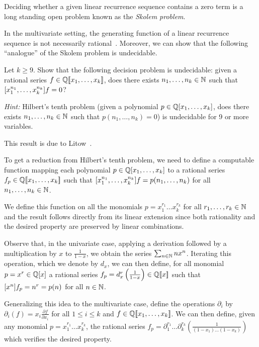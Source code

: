 Deciding whether a given linear recurrence sequence contains a zero
term is a long standing open problem known as the \emph{Skolem problem}.

In the multivariate setting, the generating function of a linear
recurrence sequence is not necessarily rational~\cite{BouPet2000}.
Moreover, we can show that the following \enquote{analogue} of the Skolem
problem is undecidable.
\begin{exercise}
    Let $k \geq 9$.
    Show that the following decision problem is undecidable:
    given a rational series $f \in \mathbb Q[\![x_1,\dots,x_k]\!]$,
    does there exists $n_1,\dots,n_k \in \mathbb N$ such that
    $[x_1^{n_1},\dots,x_k^{n_k}]f = 0$?

    \emph{Hint:} Hilbert's tenth problem (given a polynomial $p \in
        \mathbb Q[x_1,\dots,x_k]$, does there exists $n_1,\dots,n_k \in
    \mathbb N$ such that $p(n_1,\dots,n_k) = 0$) is undecidable for 9 or
    more variables.
\end{exercise}
\begin{solution}
    This result is due to Litow~\cite{Lit2003}.

    To get a reduction from Hilbert's tenth problem, we need to
    define a computable function mapping each polynomial $p \in
    \mathbb Q[x_1,\dots,x_k]$ to a rational series $f_p \in
    \mathbb Q[\![x_1,\dots,x_k]\!]$ such that
    $[x_1^{n_1},\dots,x_k^{n_k}]f = p(n_1,\dots,n_k)$ for all
    $n_1,\dots,n_k \in \mathbb N$.

    We define this function on all the monomials
    $p = x_1^{r_1} \dots x_k^{r_k}$ for all $r_1,\dots,r_k \in \mathbb N$
    and the result follows directly from its linear extension since
    both rationality and the desired property are preserved by linear
    combinations.

    Observe that, in the univariate case, applying a derivation
    followed by a multiplication by $x$ to $\frac{1}{1-x}$, we obtain
    the series $\sum_{n \in \mathbb N} n x^n$.
    Iterating this operation, which we denote by $d_x$, we can then
    define, for all monomial $p=x^r \in \mathbb Q[x]$ a rational series $f_p =
    d_x^r \left(\frac{1}{1-x}\right) \in \mathbb Q[\![x]\!]$ such that
    $[x^n]f_p = n^r = p(n)$ for all $n \in \mathbb N$.

    Generalizing this idea to the multivariate case, define the
    operations $\partial_i$ by $\partial_i (f) = x_i \frac{\partial
    f}{\partial x_i}$ for all $1 \leq i \leq k$ and $f \in
    \mathbb Q[\![x_1,\dots,x_k]\!]$.
    We can then define, given any monomial $p = x_1^{r_1} \dots x_k^{r_k}$,
    the rational series $f_p = \partial_1^{r_1} \dots
    \partial_k^{r_k} \left(\frac{1}{(1-x_1)\dots(1-x_k)}\right)$
    which verifies the desired property.
\end{solution}




